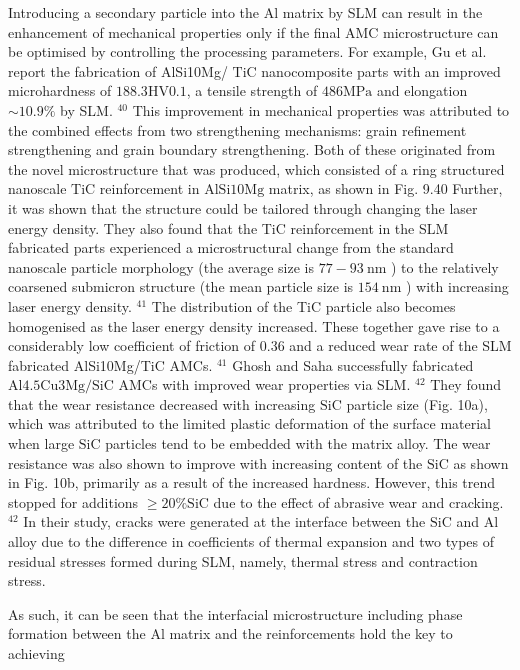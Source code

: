 \documentclass[10pt]{article}
\begin{document}
Introducing a secondary particle into the Al matrix by SLM can result in the enhancement of mechanical properties only if the final AMC microstructure can be optimised by controlling the processing parameters. For example, Gu et al. report the fabrication of AlSi10Mg/ $\mathrm{TiC}$ nanocomposite parts with an improved microhardness of $188.3 \mathrm{HV} 0.1$, a tensile strength of $486 \mathrm{MPa}$ and elongation $\sim 10.9 \%$ by SLM. ${ }^{40}$ This improvement in mechanical properties was attributed to the combined effects from two strengthening mechanisms: grain refinement strengthening and grain boundary strengthening. Both of these originated from the novel microstructure that was produced, which consisted of a ring structured nanoscale $\mathrm{TiC}$ reinforcement in $\mathrm{AlSi10Mg}$ matrix, as shown in Fig. 9.40 Further, it was shown that the structure could be tailored through changing the laser energy density. They also found that the TiC reinforcement in the SLM fabricated parts experienced a microstructural change from the standard nanoscale particle morphology (the average size is $77-93 \mathrm{~nm}$ ) to the relatively coarsened submicron structure (the mean particle size is $154 \mathrm{~nm}$ ) with increasing laser energy density. ${ }^{41}$ The distribution of the TiC particle also becomes homogenised as the laser energy density increased. These together gave rise to a considerably low coefficient of friction of 0.36 and a reduced wear rate of the SLM fabricated AlSi10Mg/TiC AMCs. ${ }^{41}$ Ghosh and Saha successfully fabricated $\mathrm{Al} 4.5 \mathrm{Cu} 3 \mathrm{Mg} / \mathrm{SiC}$ AMCs with improved wear properties via SLM. ${ }^{42}$ They found that the wear resistance decreased with increasing $\mathrm{SiC}$ particle size (Fig. 10a), which was attributed to the limited plastic deformation of the surface material when large $\mathrm{SiC}$ particles tend to be embedded with the matrix alloy. The wear resistance was also shown to improve with increasing content of the $\mathrm{SiC}$ as shown in Fig. 10b, primarily as a result of the increased hardness. However, this trend stopped for additions $\geqslant 20 \% \mathrm{SiC}$ due to the effect of abrasive wear and cracking. ${ }^{42}$ In their study, cracks were generated at the interface between the $\mathrm{SiC}$ and $\mathrm{Al}$ alloy due to the difference in coefficients of thermal expansion and two types of residual stresses formed during SLM, namely, thermal stress and contraction stress.

As such, it can be seen that the interfacial microstructure including phase formation between the $\mathrm{Al}$ matrix and the reinforcements hold the key to achieving
\end{document}
